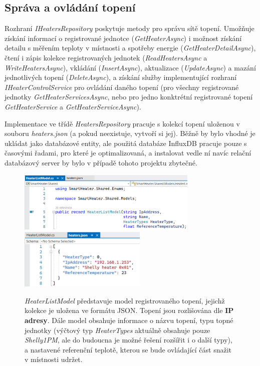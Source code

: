 \subsection{Správa a ovládání topení}
Rozhraní {\it IHeatersRepository} poskytuje metody pro správu sítě topení. Umožňuje získání informací o registrované jednotce ({\it GetHeaterAsync}) i možnost získání detailu s měřením teploty v místnosti a spotřeby energie ({\it GetHeaterDetailAsync}), čtení i zápis kolekce registrovaných jednotek ({\it ReadHeatersAsync} a {\it WriteHeatersAsync}), vkládání ({\it InsertAsync}), aktualizace ({\it UpdateAsync}) a mazání jednotlivých topení ({\it DeleteAsync}), a získání služby implementující rozhraní {\it IHeaterControlService} pro ovládání daného topení (pro všechny registrované jednotky {\it GetHeaterServicesAsync}, nebo pro jedno konktrétní registrované topení {\it GetHeaterService} a {\it GetHeaterServiceAsync}).
 
Implementace ve třídě {\it HeatersRepository} pracuje s kolekcí topení uloženou v souboru {\it heaters.json} (a pokud neexistuje, vytvoří si jej). Běžně by bylo vhodné je ukládat jako databázové entity, ale použitá databáze InfluxDB pracuje pouze s časovými řadami, pro které je optimalizovaná, a instalovat vedle ní navíc relační databázový server by bylo v případě tohoto projektu zbytečné.

\begin{figure}[hbt]
\centering
\includegraphics[height=2.9cm]{obrazky-figures/code-heaterslistmodel.png}
\includegraphics[height=2.9cm]{obrazky-figures/code-heatersjson.png}
\caption{{\it HeaterListModel} představuje model registrovaného topení, jejichž  kolekce je uložena ve formátu JSON. Topení jsou rozlišována dle \textbf{IP adresy}. Dále model obsahuje informace o názvu topení, typu topné jednotky (výčtový typ {\it HeaterTypes} aktuálně obsahuje pouze {\it Shelly1PM}, ale do budoucna je možné řešení rozšířit i o další typy), a nastavené referenční teplotě, kterou se bude ovládající část snažit v místnosti udržet.}
\end{figure}

